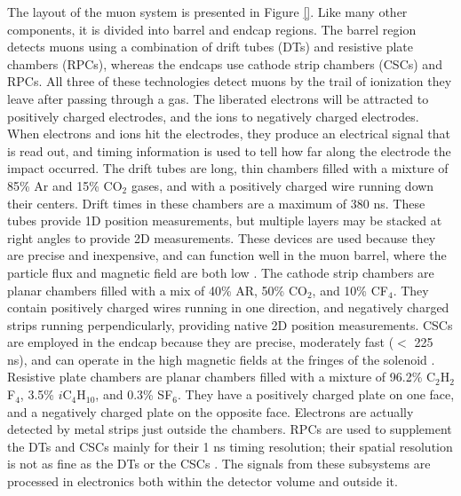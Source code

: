 The layout of the muon system is presented in Figure \ref{}.
Like many other components, it is divided into barrel and endcap
regions. The barrel region detects muons using a combination of drift
tubes (DTs) and resistive plate chambers (RPCs), whereas the endcaps use cathode
strip chambers (CSCs) and RPCs. All three of these technologies detect
muons by the trail of ionization they leave after passing through a gas. The
liberated electrons will be attracted to positively charged
electrodes, and the ions to negatively charged electrodes. When
electrons and ions hit the electrodes, they produce an electrical
signal that is read out, and timing information
is used to tell how far along the electrode the impact occurred.
The drift tubes are long, thin chambers filled with a mixture of 85\%
Ar and 15\% CO$_2$ gases, and with a positively charged wire running
down their centers. Drift times in these chambers are a maximum of 380
ns. These tubes provide 1D position measurements, but multiple layers
may be stacked at right angles to
provide 2D measurements. These devices are used because they are precise
and inexpensive, and can function well in the muon barrel, where the
particle flux and magnetic field are both low
\cite{accelexper,websitedt}. The cathode strip chambers are planar
chambers filled with a mix of 40\% AR, 50\% CO$_2$, and 10\%
CF$_4$. They contain positively charged wires running in
one direction, and negatively charged strips running perpendicularly,
providing native 2D position measurements. CSCs are employed in the
endcap because they are precise, moderately fast ($<$ 225 ns), and can operate
in the high magnetic fields at the fringes of the solenoid
\cite{accelexper,websitecsc}. Resistive plate chambers are planar
chambers filled with a mixture of 96.2\% C$_2$H$_2$F$_4$, 3.5\%
$i$C$_4$H$_{10}$, and 0.3\% SF$_6$. They have a positively charged
plate on one face, and a negatively charged plate on the
opposite face. Electrons are actually detected by metal strips just outside
the chambers. RPCs are used to supplement the DTs and CSCs
mainly for their 1 ns timing resolution; their spatial
resolution is not as fine as the DTs or the CSCs
\cite{accelexper,websiterpc}. The signals from these subsystems are
processed in electronics both within the detector volume and outside it.

